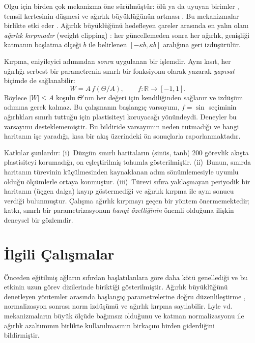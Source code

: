 \documentclass[conference,a4paper]{IEEEtran}
\begin{document}
Olgu için birden çok mekanizma öne sürülmüştür: ölü ya da uyuyan birimler \cite{sokar2023dormant,abbas2023loss},
temsil kertesinin düşmesi \cite{lyle2022understanding,dohare2024loss} ve ağırlık büyüklüğünün artması
\cite{dohare2024loss,elsayed2024weight,lyle2024normalization}. Bu mekanizmalar birlikte etki eder
\cite{lyle2024disentangling}. Ağırlık büyüklüğünü hedefleyen çareler arasında en yalın olanı \emph{ağırlık
kırpmadır} (weight clipping) \cite{elsayed2024weight}: her güncellemeden sonra her ağırlık, genişliği katmanın
başlatma ölçeği $b$ ile belirlenen $[-\kappa b,\kappa b]$ aralığına geri izdüşürülür.

Kırpma, eniyileyici adımından \emph{sonra} uygulanan bir işlemdir. Aynı kısıt, her ağırlığı serbest bir
parametrenin sınırlı bir fonksiyonu olarak yazarak \emph{yapısal} biçimde de sağlanabilir:
\begin{equation}
  W = A\, f(\Theta/A), \qquad f:\mathbb{R}\to[-1,1]. \label{eq:reparam}
\end{equation}
Böylece $|W|\le A$ koşulu $\Theta$'nın her değeri için kendiliğinden sağlanır ve izdüşüm adımına gerek kalmaz.
Bu çalışmanın başlangıç varsayımı, $f=\sin$ seçiminin ağırlıkları sınırlı tuttuğu için plastisiteyi koruyacağı
yönündeydi. Deneyler bu varsayımı desteklememiştir. Bu bildiride varsayımın neden tutmadığı ve hangi haritanın
işe yaradığı, kısa bir akış üzerindeki ön sonuçlarla raporlanmaktadır.

Katkılar şunlardır: (i)~Düzgün sınırlı haritaların (sinüs, tanh) 200 görevlik akışta plastisiteyi korumadığı,
on eşleştirilmiş tohumla gösterilmiştir. (ii)~Bunun, sınırda haritanın türevinin küçülmesinden kaynaklanan
adım sönümlemesiyle uyumlu olduğu ölçümlerle ortaya konmuştur. (iii)~Türevi sıfıra yaklaşmayan periyodik bir
haritanın (üçgen dalga) kayıp göstermediği ve ağırlık kırpma ile aynı sonucu verdiği bulunmuştur. Çalışma ağırlık
kırpmayı geçen bir yöntem önermemektedir; katkı, sınırlı bir parametrizasyonun \emph{hangi özelliğinin} önemli
olduğuna ilişkin deneysel bir gözlemdir.

\section{İlgili Çalışmalar}

Önceden eğitilmiş ağların sıfırdan başlatılanlara göre daha kötü genellediği \cite{ash2020warm} ve bu etkinin uzun
görev dizilerinde biriktiği \cite{dohare2024loss} gösterilmiştir. Ağırlık büyüklüğünü
denetleyen yöntemler arasında başlangıç parametrelerine doğru düzenlileştirme \cite{kumar2023maintaining},
normalizasyon sonrası norm izdüşümü \cite{lyle2024normalization} ve ağırlık kırpma \cite{elsayed2024weight}
sayılabilir. Lyle vd. \cite{lyle2024disentangling} mekanizmaların büyük ölçüde bağımsız olduğunu ve katman
normalizasyonu ile ağırlık azaltımının birlikte kullanılmasının birkaçını birden giderdiğini bildirmiştir.
\end{document}
